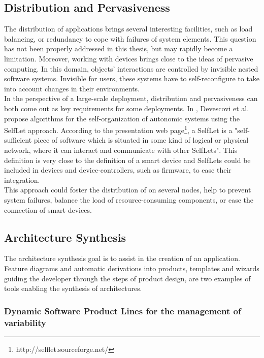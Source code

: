 \subsection{Distribution and Pervasiveness}

The distribution of applications brings several interesting facilities, such as load balancing, or redundancy to cope with failures of system elements. This question has not been properly addressed in this thesis, but may rapidly become a limitation. Moreover, working with devices brings \enti{} close to the ideas of pervasive computing. In this domain, objects' interactions are controlled by invisible nested software systems. Invisible for users, these systems have to self-reconfigure to take into account changes in their environments.\\

In the perspective of a large-scale deployment, distribution and pervasiveness can both come out as key requirements for some deployments. In \cite{Devescovi:2007}, Devescovi et al. propose algorithms for the self-organization of autonomic systems using the SelfLet approach. According to the presentation web page\footnote{http://selflet.sourceforge.net/}, a SelfLet is a "self-sufficient piece of software which is situated in some kind of logical or physical network, where it can interact and communicate with other SelfLets". This definition is very close to the definition of a smart device and SelfLets could be included in devices and device-controllers, such as firmware, to ease their integration.\\
This approach could foster the distribution of \enti{} on several nodes, help to prevent system failures, balance the load of resource-consuming components, or ease the connection of smart devices.


\subsection{Architecture Synthesis}
\label{sec:archiSynth}

The architecture synthesis goal is to assist in the creation of an application. Feature diagrams and automatic derivations into products, templates and wizards guiding the developer through the steps of product design, are two examples of tools enabling the synthesis of architectures.

\subsubsection{Dynamic Software Product Lines for the management of variability}

